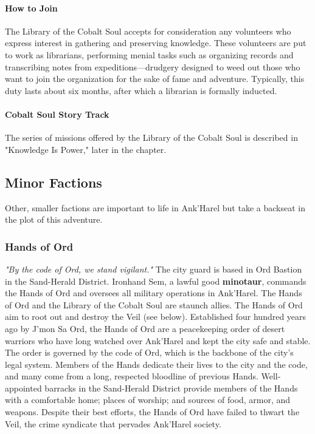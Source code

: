 \documentclass[10pt,a4,twoside,twocolumn,openany,nodeprecatedcode]{dndbook}
\begin{document}
\paragraph{How to Join}
The Library of the Cobalt Soul accepts for consideration any volunteers who express interest in gathering and preserving knowledge. These volunteers are put to work as librarians, performing menial tasks such as organizing records and transcribing notes from expeditions—drudgery designed to weed out those who want to join the organization for the sake of fame and adventure. Typically, this duty lasts about six months, after which a librarian is formally inducted.
\paragraph{Cobalt Soul Story Track}
The series of missions offered by the Library of the Cobalt Soul is described in "Knowledge Is Power," later in the chapter.
\subsection{Minor Factions}
Other, smaller factions are important to life in Ank'Harel but take a backseat in the plot of this adventure.
\subsubsection{Hands of Ord}
\textit{"By the code of Ord, we stand vigilant."}
{{The city guard is based in Ord Bastion in the Sand-Herald District.}}
{{Ironhand Sem, a lawful good \textbf{minotaur}, commands the Hands of Ord and oversees all military operations in Ank'Harel.}}
{{The Hands of Ord and the Library of the Cobalt Soul are staunch allies.}}
{{The Hands of Ord aim to root out and destroy the Veil (see below).}}
Established four hundred years ago by J'mon Sa Ord, the Hands of Ord are a peacekeeping order of desert warriors who have long watched over Ank'Harel and kept the city safe and stable.
The order is governed by the code of Ord, which is the backbone of the city's legal system. Members of the Hands dedicate their lives to the city and the code, and many come from a long, respected bloodline of previous Hands. Well-appointed barracks in the Sand-Herald District provide members of the Hands with a comfortable home; places of worship; and sources of food, armor, and weapons.
Despite their best efforts, the Hands of Ord have failed to thwart the Veil, the crime syndicate that pervades Ank'Harel society.
\end{document}
